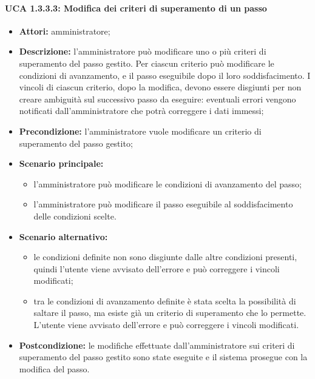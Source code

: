 \paragraph{UCA 1.3.3.3: Modifica dei criteri di superamento di un passo}
\begin{itemize}
\item \textbf{Attori:} 
amministratore;
\item \textbf{Descrizione:} 
l'amministratore può modificare uno o più criteri di superamento del passo gestito.
Per ciascun criterio può modificare le condizioni di avanzamento, e il passo eseguibile dopo il loro soddisfacimento.
I vincoli di ciascun criterio, dopo la modifica, devono essere disgiunti per non creare ambiguità sul successivo passo da eseguire: eventuali
errori vengono notificati dall'amministratore che potrà correggere i dati immessi;
\item \textbf{Precondizione:}
l'amministratore vuole modificare un criterio di superamento del passo gestito;
\item \textbf{Scenario principale:} 
\begin{itemize}
\item l'amministratore può modificare le condizioni di avanzamento del passo;
\item l'amministratore può modificare il passo eseguibile al soddisfacimento delle condizioni scelte.
\end{itemize}
\item \textbf{Scenario alternativo:}
\begin{itemize}
\item le condizioni definite non sono disgiunte dalle altre condizioni presenti, quindi l'utente viene avvisato dell'errore e può correggere i vincoli modificati;
\item tra le condizioni di avanzamento definite è stata scelta la possibilità di saltare il passo, ma esiste già un criterio di superamento che lo permette. L'utente viene avvisato dell'errore e può correggere i vincoli modificati.
\end{itemize}
\item \textbf{Postcondizione:}
le modifiche effettuate dall'amministratore sui criteri di superamento del passo gestito sono state eseguite e il sistema prosegue con la modifica del passo. 
\end{itemize}

